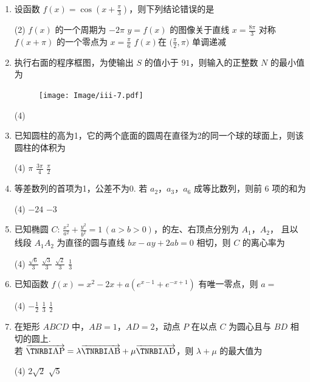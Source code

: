 \documentclass[12pt,space]{ctexart} %
\begin{document}
\begin{enumerate}[itemsep=0.2em,topsep=0pt]
  \item 设函数 $\displaystyle{f(x)=\cos\left (x+\frac{\pi}{3}\right )}$，则下列结论错误的是
    \begin{tasks}(2)
      \task $f(x)$ 的一个周期为 $-2\pi$ \task $y=f(x)$ 的图像关于直线 $x=\frac{8\pi}{3}$ 对称
      \task $f(x+\pi)$ 的一个零点为 $x=\frac{\pi}{6}$ \task  $f(x)$在 $\Big(\frac{\pi}{2},\pi\Big)$ 单调递减 
    \end{tasks}

  \item 执行右面的程序框图，为使输出 $S$ 的值小于 $91$，则输入的正整数 $N$ 的最小值为
    \begin{figure}[htbp]
      \centering
      \texttt{[image: Image/iii-7.pdf]}
    \end{figure}
    \begin{tasks}(4)
          
    \end{tasks}

  \item 已知圆柱的高为1，它的两个底面的圆周在直径为2的同一个球的球面上，则该圆柱的体积为
    \begin{tasks}(4)
      \task $\pi$ \task $\displaystyle{\frac{3\pi}{4}}$ \task $\displaystyle{\frac{\pi}{2}}$  
    \end{tasks}

  \item 等差数列的首项为1，公差不为0. 若 $a_2$，$a_3$，$a_6$ 成等比数列，则前 6 项的和为
    \begin{tasks}(4)
      \task $-24$ \task $-3$   
    \end{tasks}

  \item 已知椭圆 $\displaystyle{C\colon\,\frac{x^2}{a^2}+\frac{y^2}{b^2}=1\,(a>b>0)}$，的左、右顶点分别为 $A_1$，$A_2$，
    且以线段 $A_1A_2$ 为直径的圆与直线 $bx-ay+2ab=0$ 相切，则 $C$ 的离心率为
    \begin{tasks}(4)
      \task $\displaystyle{\frac{\sqrt{6}}{3}}$ \task $\displaystyle{\frac{\sqrt{3}}{3}}$ 
      \task $\displaystyle{\frac{\sqrt{2}}{3}}$ \task $\displaystyle{\frac{1}{3}}$ 
    \end{tasks}

\item 已知函数 $f(x)=x^2-2x+a(e^{x-1}+e^{-x+1})$ 有唯一零点，则 $a=$
\begin{tasks}(4)
	\task $-\frac{1}{2}$ \task $\frac{1}{3}$ \task $\frac{1}{2}$  
\end{tasks}
\item 在矩形 $ABCD$ 中，$AB=1$，$AD=2$，动点 $P$ 在以点 $C$ 为圆心且与 $BD$ 相切的圆上.\\
若 $\overrightarrow{\bfit{AP}}=\lambda\overrightarrow{\bfit{AB} }+\mu\overrightarrow{\bfit{AD}}$，则 $\lambda+\mu$ 的最大值为
\begin{tasks}(4)
	 \task $2\sqrt{2}$ \task $\sqrt{5}$  
\end{tasks}
\end{enumerate}
\end{document}
